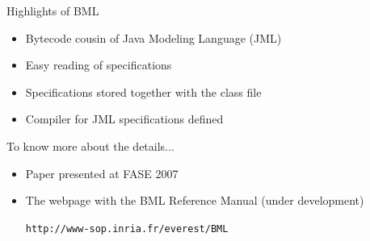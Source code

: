 \documentclass[final,nocolorBG,a4,mobius,nototal,pdf,slideColor]{prosper}
\begin{document}
\begin{slide}{Highlights of BML}
\begin{itemize}
\item Bytecode cousin of Java Modeling Language (JML)
\item Easy reading of specifications
\item Specifications stored together with the class file
\item Compiler for JML specifications defined
\end{itemize}
\end{slide}

\begin{slide}{To know more about the details...}
\begin{itemize}
\item Paper presented at FASE 2007
\item The webpage with the BML Reference Manual (under development)
\begin{center}
\texttt{http://www-sop.inria.fr/everest/BML}
\end{center}
\end{itemize}
\end{slide}
\end{document}

